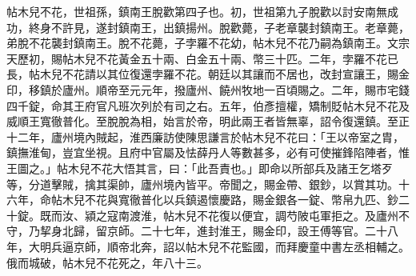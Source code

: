 \begin{pinyinscope}
 帖木兒不花，世祖孫，鎮南王脫歡第四子也。初，世祖第九子脫歡以討安南無成功，終身不許見，遂封鎮南王，出鎮揚州。脫歡薨，子老章襲封鎮南王。老章薨，弟脫不花襲封鎮南王。脫不花薨，子孛羅不花幼，帖木兒不花乃嗣為鎮南王。文宗天歷初，賜帖木兒不花黃金五十兩、白金五十兩、幣三十匹。二年，孛羅不花已長，帖木兒不花請以其位復還孛羅不花。朝廷以其讓而不居也，改封宣讓王，賜金印，移鎮於廬州。順帝至元元年，撥廬州、饒州牧地一百頃賜之。二年，賜市宅錢四千錠，命其王府官凡班次列於有司之右。五年，伯彥擅權，矯制貶帖木兒不花及威順王寬徹普化。至脫脫為相，始言於帝，明此兩王者皆無辜，詔令復還鎮。至正十二年，廬州境內賊起，淮西廉訪使陳思謙言於帖木兒不花曰：「王以帝室之胄，鎮撫淮甸，豈宜坐視。且府中官屬及怯薛丹人等數甚多，必有可使摧鋒陷陣者，惟王圖之。」帖木兒不花大悟其言，曰：「此吾責也。」即命以所部兵及諸王乞塔歹等，分道擊賊，擒其渠帥，廬州境內皆平。帝聞之，賜金帶、銀鈔，以賞其功。十六年，命帖木兒不花與寬徹普化以兵鎮遏懷慶路，賜金銀各一錠、幣帛九匹、鈔二十錠。既而汝、潁之寇南渡淮，帖木兒不花復以便宜，調芍陂屯軍拒之。及廬州不守，乃挈身北歸，留京師。二十七年，進封淮王，賜金印，設王傅等官。二十八年，大明兵逼京師，順帝北奔，詔以帖木兒不花監國，而拜慶童中書左丞相輔之。俄而城破，帖木兒不花死之，年八十三。



\end{pinyinscope}